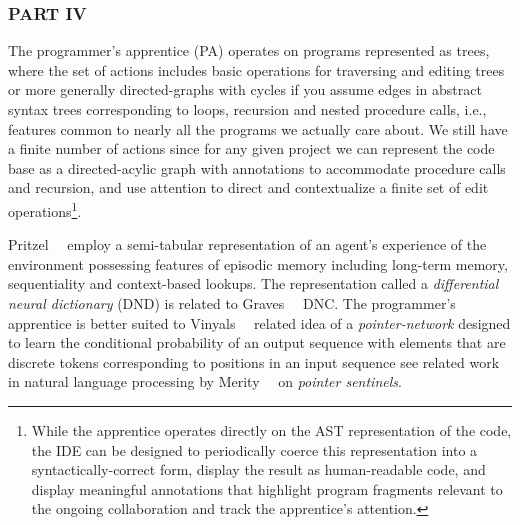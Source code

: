 


\subsubsection*{PART IV}


The programmer's apprentice (PA) operates on programs represented as trees, where the set of actions includes basic operations for traversing and editing trees \emdash{} or more generally directed-graphs with cycles if you assume edges in abstract syntax trees corresponding to loops, recursion and nested procedure calls, i.e., features common to nearly all the programs we actually care about. We still have a finite number of actions since for any given project we can represent the code base as a directed-acylic graph with annotations to accommodate procedure calls and recursion, and use attention to direct and contextualize a finite set of edit operations\footnote{%
%
  While the apprentice operates directly on the AST representation of the code, the IDE can be designed to periodically coerce this representation into a syntactically-correct form, display the result as human-readable code, and display meaningful annotations that highlight program fragments relevant to the ongoing collaboration and track the apprentice's attention.}.

Pritzel~\etal{}~\cite{PritzeletalCoRR-17} employ a semi-tabular representation of an agent's experience of the environment possessing features of episodic memory including long-term memory, sequentiality and context-based lookups. The representation called a {\it{differential neural dictionary}} (DND) is related to Graves~\etal{}~\cite{GravesetalNATURE-16} DNC. The programmer's apprentice is better suited to Vinyals~\etal{}~\cite{VinyalsetalNIPS-15} related idea of a {\it{pointer-network}} designed to learn the conditional probability of an output sequence with elements that are discrete tokens corresponding to positions in an input sequence \emdash{} see related work in natural language processing by Merity~\etal{}~\cite{MerityetalCoRR-16} on {\it{pointer sentinels}}.

